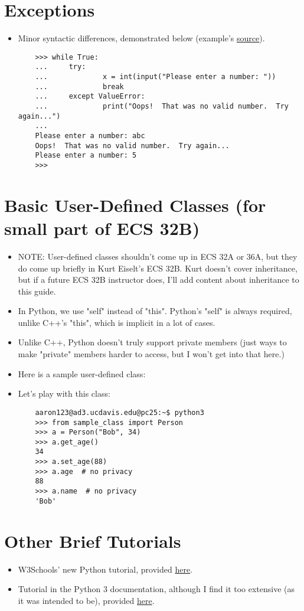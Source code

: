 \documentclass{article}
\begin{document}
\section{Exceptions}
\begin{itemize}
    \item Minor syntactic differences, demonstrated below (example's \href{https://docs.python.org/3/tutorial/errors.html}{source}).
    \begin{lstlisting}
    >>> while True:
    ...     try:
    ...             x = int(input("Please enter a number: "))
    ...             break
    ...     except ValueError:
    ...             print("Oops!  That was no valid number.  Try again...")
    ...
    Please enter a number: abc
    Oops!  That was no valid number.  Try again...
    Please enter a number: 5
    >>>
    \end{lstlisting}
\end{itemize}

\section{Basic User-Defined Classes (for small part of ECS 32B)}
\begin{itemize}
    \item NOTE: User-defined classes shouldn't come up in ECS 32A or 36A, but they do come up briefly in Kurt Eiselt's ECS 32B. Kurt doesn't cover inheritance, but if a future ECS 32B instructor does, I'll add content about inheritance to this guide.
    \item In Python, we use "self" instead of "this". Python's "self" is always required, unlike C++'s "this", which is implicit in a lot of cases.
    \item Unlike C++, Python doesn't truly support private members (just ways to make "private" members harder to access, but I won't get into that here.)
    \item Here is a sample user-defined class:
    
    \item Let's play with this class:
    \begin{lstlisting}
    aaron123@ad3.ucdavis.edu@pc25:~$ python3
    >>> from sample_class import Person
    >>> a = Person("Bob", 34)
    >>> a.get_age()
    34
    >>> a.set_age(88)
    >>> a.age  # no privacy
    88
    >>> a.name  # no privacy
    'Bob'
    \end{lstlisting}
\end{itemize}

\section{Other Brief Tutorials}
\begin{itemize}
    \item W3Schools' new Python tutorial, provided \href{https://www.w3schools.com/python/default.asp}{here}.
    \item Tutorial in the Python 3 documentation, although I find it too extensive (as it was intended to be), provided \href{https://docs.python.org/3/tutorial/}{here}.
\end{itemize}
\end{document}
